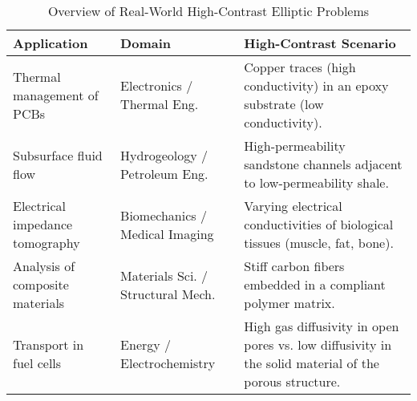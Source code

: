 
\begin{table}[H]
\centering
\caption{Overview of Real-World High-Contrast Elliptic Problems}
\label{tab:high_contrast_examples}
\begin{tabularx}{\textwidth}{@{} l l >{\raggedright\arraybackslash}X @{}}
\toprule
\textbf{Application} & \textbf{Domain} & \textbf{High-Contrast Scenario} \\
\midrule
Thermal management of PCBs & Electronics / Thermal Eng. & Copper traces (high conductivity) in an epoxy substrate (low conductivity). \\
\addlinespace
Subsurface fluid flow & Hydrogeology / Petroleum Eng. & High-permeability sandstone channels adjacent to low-permeability shale. \\
\addlinespace
Electrical impedance tomography & Biomechanics / Medical Imaging & Varying electrical conductivities of biological tissues (muscle, fat, bone). \\
\addlinespace
Analysis of composite materials & Materials Sci. / Structural Mech. & Stiff carbon fibers embedded in a compliant polymer matrix. \\
\addlinespace
Transport in fuel cells & Energy / Electrochemistry & High gas diffusivity in open pores vs. low diffusivity in the solid material of the porous structure. \\
\bottomrule
\end{tabularx}
\end{table}